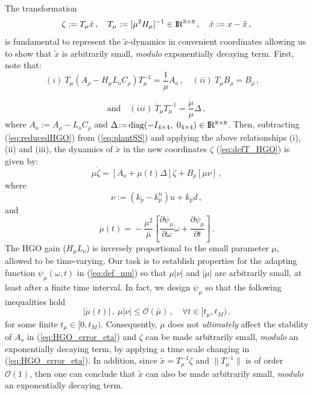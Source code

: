 \documentclass[letterpaper, 10 pt, conference]{ieeeconf}  %
\def\re{{\rm I}\! {\rm R}}
\theoremstyle{plain}
\theoremstyle{definition}
\theoremstyle{remark}
\begin{document}
The transformation \cite{OK:97}
%
\begin{equation}
\zeta:=T_{\mu}\tilde{x}\,, \quad T_\mu:=[\mu^2
H_\mu]^{-1} \in \re^{8 \times 8}\,, \quad \tilde{x}:= x-\hat{x}\,,\label{eq:defT_HGO}
\end{equation}
%
is fundamental to represent the $\tilde{x}$-dynamics in 
convenient coordinates allowing us to show that $\tilde{x}$ is
arbitrarily small, {\em modulo} exponentially decaying term. First,
note that:
%
$$(i) \ T_\mu(A_\rho-H_\mu L_o
C_\rho)T_\mu^{-1}\!=\!\frac{1}{\mu}A_o\,, \quad (ii) \ T_\mu B_\rho\!=\!B_\rho\,, \quad$$ 


$$\mbox{and} \quad
(iii) \ \dot{T}_\mu T_\mu^{-1}\!=\!\frac{\dot{\mu}}{\mu}
\Delta\,,$$
%
where $A_o\!:=\!A_\rho\!-\!L_o C_\rho$ and
$\Delta\!:=\!\mbox{diag}(-I_{4 \times 4}, \ 0_{4 \times 4}) \in \re^{8 \times 8}$.
%
Then, subtracting (\ref{eq:reducedHGO}) from
(\ref{eq:plantSS}) and applying the above
relationships (i),
(ii) and (iii), the dynamics of $\tilde{x}$ 
in the new coordinates $\zeta$ (\ref{eq:defT_HGO}) is given by:
%
\begin{equation}
\mu \dot{\zeta} = [A_o+ \dot{\mu}(t) \Delta] \zeta + B_\rho [\mu
\nu]\,, \label{eq:HGO_error_eta}
\end{equation}
%
where %
%
\begin{equation}
\nu:=(k_p-k_p^n)u+k_p d\,,\label{eq:def_nu}
\end{equation}
%
and
%
\begin{equation}
\dot{\mu}(t)\!=\!-\frac{\mu^2}{\bar{\mu}} \left[\frac{\partial
\psi_\mu}{\partial \omega} \dot{\omega}+\frac{\partial
\psi_\mu}{\partial t}\right]\,. \label{eq:def_mudot}
\end{equation}
%
The HGO gain ($H_\mu L_o$) is inversely proportional to the small parameter $\mu$,
allowed to be time-varying. %
Our task is to establish properties for the adapting
function $\psi_\mu(\omega,t)$ in (\ref{eq:def_mu}) so that $\mu
|\nu|$ and $|\dot{\mu}|$ are arbitrarily small, at least after a
finite time interval. In fact, we design $\psi_\mu$ so that the following inequalities hold
%
\begin{equation}
|\dot{\mu}(t)|\,, \ \mu |\nu| \leq \mathcal{O}(\bar{\mu})\,, \quad
\forall t \in [t_\mu,t_M)\,. \label{eq:mudotmunu}
\end{equation}
%
for  some finite $t_\mu \in [0,t_M)$.  Consequently, $\dot{\mu}$ does not {\em
ultimately} affect the stability of $A_o$ in
(\ref{eq:HGO_error_eta}) and $\zeta$  can be made
arbitrarily small, {\em modulo} an exponentially decaying term, by applying a time scale changing in (\ref{eq:HGO_error_eta}). In addition, since $\tilde{x} = T_\mu^{-1} \zeta$ and $\|T_\mu^{-1}\|$ is of order $\mathcal{O}(1)$, then one can conclude that $\tilde{x}$ can also be made
arbitrarily small, {\em modulo} an exponentially decaying term.
\end{document}
